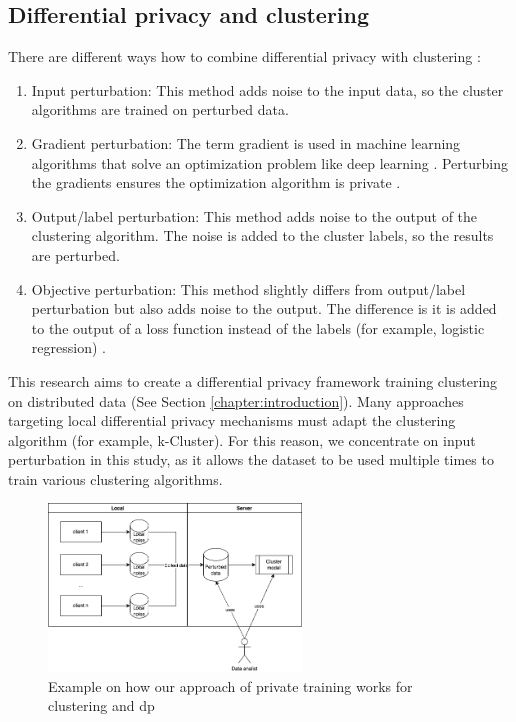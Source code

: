 \subsection{Differential privacy and clustering}
There are different ways how to combine differential privacy with clustering \citep{baraheem_survey_2022}:
\begin{enumerate}
  \item Input perturbation: This method adds noise to the input data, so the cluster algorithms are trained on perturbed data.
  \item Gradient perturbation: The term gradient is used in machine learning algorithms that solve an optimization problem like deep learning \citep{hassan_differential_2019}.
        Perturbing the gradients ensures the optimization algorithm is private \citep{ji_differential_2014}.
  \item Output/label perturbation: This method adds noise to the output of the clustering algorithm.
        The noise is added to the cluster labels, so the results are perturbed.
  \item Objective perturbation: This method slightly differs from output/label perturbation but also adds noise to the output.
        The difference is it is added to the output of a loss function instead of the labels (for example, logistic regression) \citep{baraheem_survey_2022}.
\end{enumerate}
This research aims to create a differential privacy framework training clustering on distributed data (See Section \ref{chapter:introduction}).
Many approaches targeting local differential privacy mechanisms must adapt the clustering algorithm (for example, k-Cluster).
For this reason, we concentrate on input perturbation in this study, as it allows the dataset to be used multiple times to train various clustering algorithms.
\begin{figure}[ht]
  \includegraphics[width=0.6\textwidth]{./TheorethicalFramework/ND-Laplace/Images/overview-clustering&dp.png}
  \caption{Example on how our approach of private training works for clustering and \gls{dp}}
  \label{fig:overview-clustering-and-dp}
\end{figure}
